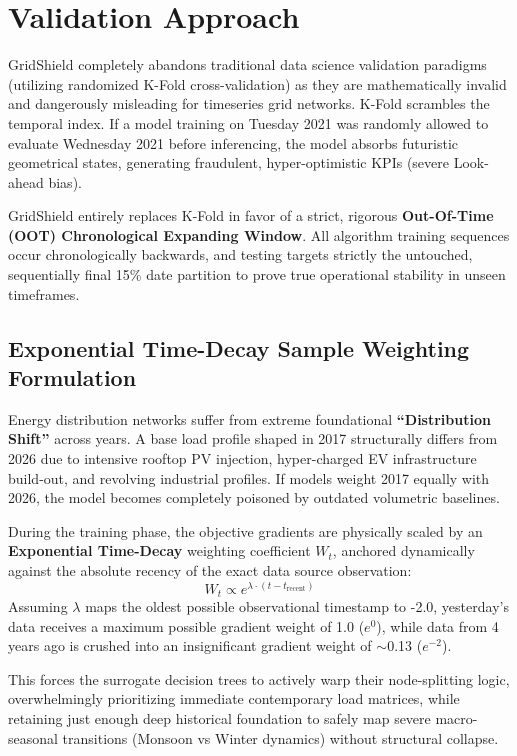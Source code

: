 \documentclass[11pt,a4paper]{article}
\begin{document}
\section{Validation Approach}

GridShield completely abandons traditional data science validation paradigms (utilizing randomized K-Fold cross-validation) as they are mathematically invalid and dangerously misleading for timeseries grid networks. K-Fold scrambles the temporal index. If a model training on Tuesday 2021 was randomly allowed to evaluate Wednesday 2021 before inferencing, the model absorbs futuristic geometrical states, generating fraudulent, hyper-optimistic KPIs (severe Look-ahead bias).

GridShield entirely replaces K-Fold in favor of a strict, rigorous \textbf{Out-Of-Time (OOT) Chronological Expanding Window}. All algorithm training sequences occur chronologically backwards, and testing targets strictly the untouched, sequentially final 15\% date partition to prove true operational stability in unseen timeframes.

\subsection{Exponential Time-Decay Sample Weighting Formulation}
Energy distribution networks suffer from extreme foundational \textbf{``Distribution Shift''} across years. A base load profile shaped in 2017 structurally differs from 2026 due to intensive rooftop PV injection, hyper-charged EV infrastructure build-out, and revolving industrial profiles. If models weight 2017 equally with 2026, the model becomes completely poisoned by outdated volumetric baselines.

During the training phase, the objective gradients are physically scaled by an \textbf{Exponential Time-Decay} weighting coefficient $W_t$, anchored dynamically against the absolute recency of the exact data source observation:
\begin{equation}
W_{t} \propto e^{\lambda \cdot (t - t_{\text{recent}})}
\end{equation}
Assuming $\lambda$ maps the oldest possible observational timestamp to -2.0, yesterday's data receives a maximum possible gradient weight of 1.0 ($e^0$), while data from 4 years ago is crushed into an insignificant gradient weight of $\sim$0.13 ($e^{-2}$). 

This forces the surrogate decision trees to actively warp their node-splitting logic, overwhelmingly prioritizing immediate contemporary load matrices, while retaining just enough deep historical foundation to safely map severe macro-seasonal transitions (Monsoon vs Winter dynamics) without structural collapse.
\end{document}
